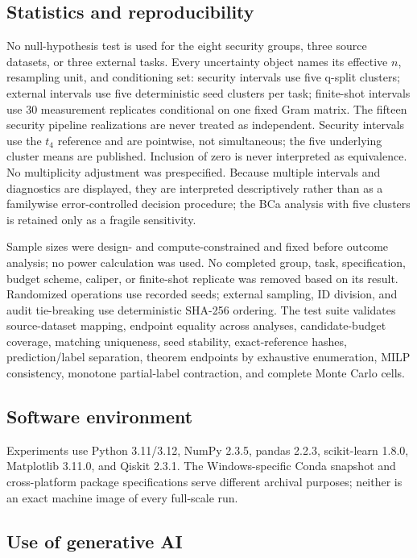 \documentclass[referee,lineno,pdflatex,sn-vancouver-num]{sn-jnl}
\theoremstyle{thmstyleone}%
\theoremstyle{thmstyletwo}%
\theoremstyle{thmstylethree}%
\begin{document}
\subsection{Statistics and reproducibility}

No null-hypothesis test is used for the eight security groups, three source datasets, or three external tasks. Every uncertainty object names its effective $n$, resampling unit, and conditioning set: security intervals use five q-split clusters; external intervals use five deterministic seed clusters per task; finite-shot intervals use 30 measurement replicates conditional on one fixed Gram matrix. The fifteen security pipeline realizations are never treated as independent. Security intervals use the $t_4$ reference and are pointwise, not simultaneous; the five underlying cluster means are published. Inclusion of zero is never interpreted as equivalence. No multiplicity adjustment was prespecified. Because multiple intervals and diagnostics are displayed, they are interpreted descriptively rather than as a familywise error-controlled decision procedure; the BCa analysis with five clusters is retained only as a fragile sensitivity.

Sample sizes were design- and compute-constrained and fixed before outcome analysis; no power calculation was used. No completed group, task, specification, budget scheme, caliper, or finite-shot replicate was removed based on its result. Randomized operations use recorded seeds; external sampling, ID division, and audit tie-breaking use deterministic SHA-256 ordering. The test suite validates source-dataset mapping, endpoint equality across analyses, candidate-budget coverage, matching uniqueness, seed stability, exact-reference hashes, prediction/label separation, theorem endpoints by exhaustive enumeration, MILP consistency, monotone partial-label contraction, and complete Monte Carlo cells.

\subsection{Software environment}

Experiments use Python 3.11/3.12, NumPy 2.3.5, pandas 2.2.3, scikit-learn 1.8.0, Matplotlib 3.11.0, and Qiskit 2.3.1. The Windows-specific Conda snapshot and cross-platform package specifications serve different archival purposes; neither is an exact machine image of every full-scale run.

\subsection{Use of generative AI}
\end{document}
